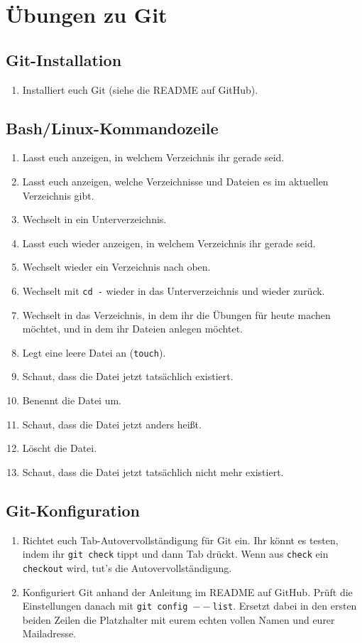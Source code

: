 \documentclass[a4paper,12pt]{scrartcl}
\begin{document}
\raggedbottom

\section{Übungen zu Git}

\subsection{Git-Installation}
\begin{enumerate}
  \item Installiert euch Git (siehe die README auf GitHub).
\end{enumerate}

\subsection{Bash/Linux-Kommandozeile}
\begin{enumerate}
  \item Lasst euch anzeigen, in welchem Verzeichnis ihr gerade seid.
  \item Lasst euch anzeigen, welche Verzeichnisse und Dateien es im aktuellen Verzeichnis gibt.
  \item Wechselt in ein Unterverzeichnis.
  \item Lasst euch wieder anzeigen, in welchem Verzeichnis ihr gerade seid.
  \item Wechselt wieder ein Verzeichnis nach oben.
  \item Wechselt mit \texttt{cd -} wieder in das Unterverzeichnis und wieder zurück.
  \item Wechselt in das Verzeichnis, in dem ihr die Übungen für heute machen möchtet, und in dem ihr Dateien anlegen möchtet.
  \item Legt eine leere Datei an (\texttt{touch}).
  \item Schaut, dass die Datei jetzt tatsächlich existiert.
  \item Benennt die Datei um.
  \item Schaut, dass die Datei jetzt anders heißt.
  \item Löscht die Datei.
  \item Schaut, dass die Datei jetzt tatsächlich nicht mehr existiert.
\end{enumerate}

\subsection{Git-Konfiguration}
\begin{enumerate}
   \item Richtet euch Tab-Autovervollständigung für Git ein. Ihr könnt es testen, indem ihr \texttt{git check} tippt und dann Tab drückt. Wenn aus \texttt{check} ein \texttt{checkout} wird, tut's die Autovervollständigung.
  \item Konfiguriert Git anhand der Anleitung im README auf GitHub. Prüft die Einstellungen danach mit \texttt{git config $--$list}. Ersetzt dabei in den ersten beiden Zeilen die Platzhalter mit eurem echten vollen Namen und eurer Mailadresse.
\end{enumerate}
\end{document}
